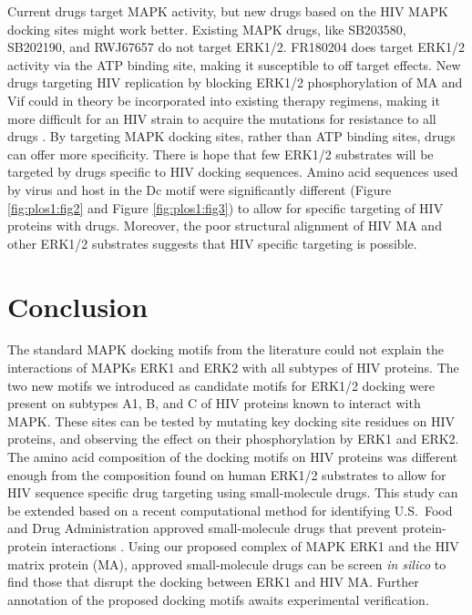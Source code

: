Current drugs target MAPK activity, but new drugs based on the HIV
MAPK docking sites might work better. Existing MAPK drugs, like
SB203580, SB202190, and RWJ67657 do not target ERK1/2. FR180204 does
target ERK1/2 activity via the ATP binding site, making it susceptible
to off target effects. New drugs targeting HIV replication by blocking
ERK1/2 phosphorylation of MA and Vif could in theory be incorporated
into existing therapy regimens, making it more difficult for an HIV
strain to acquire the mutations for resistance to all drugs
\cite{deeks03}. By targeting MAPK docking sites, rather than ATP
binding sites, drugs can offer more specificity. There is hope that
few ERK1/2 substrates will be targeted by drugs specific to HIV
docking sequences. Amino acid sequences used by virus and host in the
Dc motif were significantly different (Figure \ref{fig:plos1:fig2} and
Figure \ref{fig:plos1:fig3}) to allow for specific targeting of HIV
proteins with drugs. Moreover, the poor structural alignment of HIV MA
and other ERK1/2 substrates suggests that HIV specific targeting is
possible.

\section{Conclusion}

The standard MAPK docking motifs from the literature could not explain
the interactions of MAPKs ERK1 and ERK2 with all subtypes of HIV
proteins. The two new motifs we introduced as candidate motifs for
ERK1/2 docking were present on subtypes A1, B, and C of HIV proteins
known to interact with MAPK. These sites can be tested by mutating key
docking site residues on HIV proteins, and observing the effect on
their phosphorylation by ERK1 and ERK2. The amino acid composition of
the docking motifs on HIV proteins was different enough from the
composition found on human ERK1/2 substrates to allow for HIV sequence
specific drug targeting using small-molecule drugs. This study can be
extended based on a recent computational method for identifying
U.S.\ Food and Drug Administration approved small-molecule drugs that
prevent protein-protein interactions
\cite{parthasarathi2008approved}. Using our proposed complex of MAPK
ERK1 and the HIV matrix protein (MA), approved small-molecule drugs
can be screen \textit{in silico} to find those that disrupt the docking between
ERK1 and HIV MA. Further annotation of the proposed docking motifs
awaits experimental verification.

